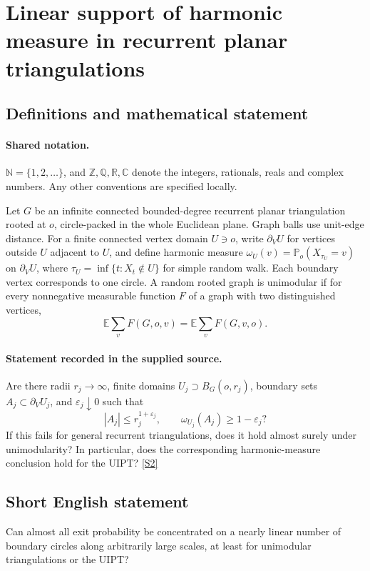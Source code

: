 \documentclass[11pt]{article}
\newcommand{\sref}[2]{\hyperlink{source:#1:#2}{[S#2]}}
\begin{document}
\section{Linear support of harmonic measure in recurrent planar triangulations}\label{statement}

\subsection{Definitions and mathematical statement}

\paragraph{Shared notation.}$\mathbb N=\{1,2,\ldots\}$, and $\mathbb Z,\mathbb Q,\mathbb R,\mathbb C$ denote the integers, rationals, reals and complex numbers. Any other conventions are specified locally.


Let $G$ be an infinite connected bounded-degree recurrent planar triangulation rooted at $o$, circle-packed in the whole Euclidean plane. Graph balls use unit-edge distance. For a finite connected vertex domain $U\ni o$, write $\partial_VU$ for vertices outside $U$ adjacent to $U$, and define harmonic measure $\omega_U(v)=\mathbb P_o(X_{\tau_U}=v)$ on $\partial_VU$, where $\tau_U=\inf\{t:X_t\notin U\}$ for simple random walk. Each boundary vertex corresponds to one circle. A random rooted graph is unimodular if for every nonnegative measurable function $F$ of a graph with two distinguished vertices,
\[\mathbb E\sum_vF(G,o,v)=\mathbb E\sum_vF(G,v,o).\]
\paragraph{Statement recorded in the supplied source.}
Are there radii $r_j\to\infty$, finite domains $U_j\supset B_G(o,r_j)$, boundary sets $A_j\subset\partial_VU_j$, and $\varepsilon_j\downarrow0$ such that
\[|A_j|\le r_j^{1+\varepsilon_j},\qquad\omega_{U_j}(A_j)\ge1-\varepsilon_j?\]
If this fails for general recurrent triangulations, does it hold almost surely under unimodularity? In particular, does the corresponding harmonic-measure conclusion hold for the UIPT? \sref{statement}{2}
\subsection{Short English statement}
Can almost all exit probability be concentrated on a nearly linear number of boundary circles along arbitrarily large scales, at least for unimodular triangulations or the UIPT?
\end{document}
